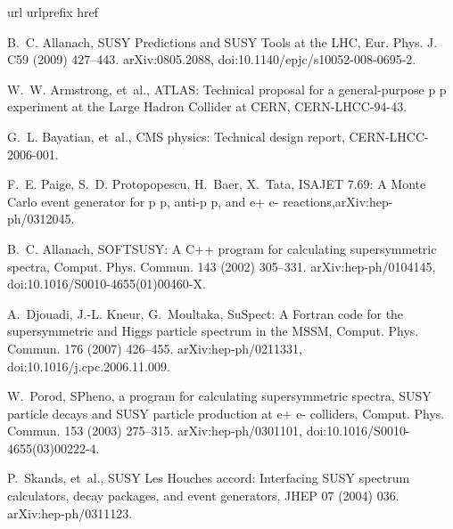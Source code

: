 \documentclass[final,3p,times,pdflatex]{elsarticle}
\begin{document}
\begin{thebibliography}{10}
\expandafter\ifx\csname url\endcsname\relax
  \def\url#1{\texttt{#1}}\fi
\expandafter\ifx\csname urlprefix\endcsname\relax\def\urlprefix{URL }\fi
\expandafter\ifx\csname href\endcsname\relax
  \def\href#1#2{#2} \def\path#1{#1}\fi

B.~C. Allanach, {SUSY Predictions and SUSY Tools at the LHC}, Eur. Phys. J. C59
  (2009) 427--443.
\newblock \href {http://arxiv.org/abs/0805.2088} {\path{arXiv:0805.2088}},
  \href {http://dx.doi.org/10.1140/epjc/s10052-008-0695-2}
  {\path{doi:10.1140/epjc/s10052-008-0695-2}}.

W.~W. Armstrong, et~al., {ATLAS: Technical proposal for a general-purpose p p
  experiment at the Large Hadron Collider at CERN}, CERN-LHCC-94-43.

G.~L. Bayatian, et~al., {CMS physics: Technical design
  report}, CERN-LHCC-2006-001.

F.~E. Paige, S.~D. Protopopescu, H.~Baer, X.~Tata, {ISAJET 7.69: A Monte Carlo
  event generator for p p, anti-p p, and e+ e- reactions},\href
  {http://arxiv.org/abs/hep-ph/0312045} {\path{arXiv:hep-ph/0312045}}.

B.~C. Allanach, {SOFTSUSY: A C++ program for calculating supersymmetric
  spectra}, Comput. Phys. Commun. 143 (2002) 305--331.
\newblock \href {http://arxiv.org/abs/hep-ph/0104145}
  {\path{arXiv:hep-ph/0104145}}, \href
  {http://dx.doi.org/10.1016/S0010-4655(01)00460-X}
  {\path{doi:10.1016/S0010-4655(01)00460-X}}.

A.~Djouadi, J.-L. Kneur, G.~Moultaka, {SuSpect: A Fortran code for the
  supersymmetric and Higgs particle spectrum in the MSSM}, Comput. Phys.
  Commun. 176 (2007) 426--455.
\newblock \href {http://arxiv.org/abs/hep-ph/0211331}
  {\path{arXiv:hep-ph/0211331}}, \href
  {http://dx.doi.org/10.1016/j.cpc.2006.11.009}
  {\path{doi:10.1016/j.cpc.2006.11.009}}.

W.~Porod, {SPheno, a program for calculating supersymmetric spectra, SUSY
  particle decays and SUSY particle production at e+ e- colliders}, Comput.
  Phys. Commun. 153 (2003) 275--315.
\newblock \href {http://arxiv.org/abs/hep-ph/0301101}
  {\path{arXiv:hep-ph/0301101}}, \href
  {http://dx.doi.org/10.1016/S0010-4655(03)00222-4}
  {\path{doi:10.1016/S0010-4655(03)00222-4}}.

P.~Skands, et~al., {SUSY Les Houches accord: Interfacing SUSY spectrum
  calculators, decay packages, and event generators}, JHEP 07 (2004) 036.
\newblock \href {http://arxiv.org/abs/hep-ph/0311123}
  {\path{arXiv:hep-ph/0311123}}.


\end{thebibliography}
\end{document}
